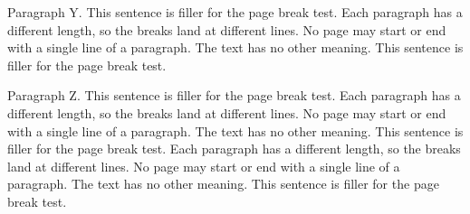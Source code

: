 Paragraph Y. This sentence is filler for the page break test. Each paragraph
has a different length, so the breaks land at different lines. No page may
start or end with a single line of a paragraph. The text has no other meaning.
This sentence is filler for the page break test.

Paragraph Z. This sentence is filler for the page break test. Each paragraph
has a different length, so the breaks land at different lines. No page may
start or end with a single line of a paragraph. The text has no other meaning.
This sentence is filler for the page break test. Each paragraph has a
different length, so the breaks land at different lines. No page may start or
end with a single line of a paragraph. The text has no other meaning. This
sentence is filler for the page break test.

